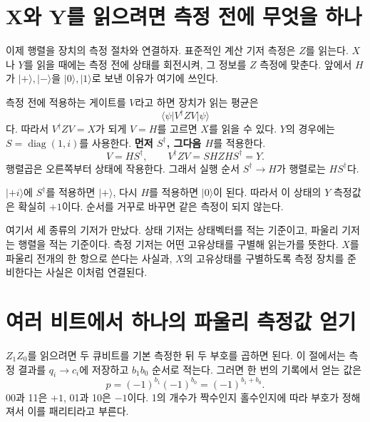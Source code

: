 \section{X와 Y를 읽으려면 측정 전에 무엇을 하나}

이제 행렬을 장치의 측정 절차와 연결하자.
표준적인 계산 기저 측정은 \(Z\)를 읽는다.
\(X\)나 \(Y\)를 읽을 때에는 측정 전에 상태를 회전시켜, 그 정보를 \(Z\) 측정에 맞춘다.
앞에서 \(H\)가 \(\lvert+\rangle,\lvert-\rangle\)을
\(\lvert0\rangle,\lvert1\rangle\)로 보낸 이유가 여기에 쓰인다.

측정 전에 적용하는 게이트를 \(V\)라고 하면 장치가 읽는 평균은
\[
\langle\psi\rvert V^\dagger ZV\lvert\psi\rangle
\]
다. 따라서 \(V^\dagger ZV=X\)가 되게 \(V=H\)를 고르면 \(X\)를 읽을 수 있다.
\(Y\)의 경우에는 \(S=\operatorname{diag}(1,i)\)를 사용한다.
\textbf{먼저 \(S^\dagger\), 그다음 \(H\)}를 적용한다.
\[
V=HS^\dagger,\qquad V^\dagger ZV=SHZHS^\dagger=Y.
\]
행렬곱은 오른쪽부터 상태에 작용한다. 그래서 실행 순서
\(S^\dagger\to H\)가 행렬로는 \(HS^\dagger\)다.


\(\lvert+i\rangle\)에 \(S^\dagger\)를 적용하면 \(\lvert+\rangle\),
다시 \(H\)를 적용하면 \(\lvert0\rangle\)이 된다.
따라서 이 상태의 \(Y\) 측정값은 확실히 \(+1\)이다.
순서를 거꾸로 바꾸면 같은 측정이 되지 않는다.

여기서 세 종류의 기저가 만났다. 상태 기저는 상태벡터를 적는 기준이고,
파울리 기저는 행렬을 적는 기준이다. 측정 기저는 어떤 고유상태를 구별해 읽는가를 뜻한다.
\(X\)를 파울리 전개의 한 항으로 쓴다는 사실과,
\(X\)의 고유상태를 구별하도록 측정 장치를 준비한다는 사실은 이처럼 연결된다.

\section{여러 비트에서 하나의 파울리 측정값 얻기}

\(Z_1Z_0\)를 읽으려면 두 큐비트를 기본 측정한 뒤 두 부호를 곱하면 된다.
이 절에서는 측정 결과를 \(q_i\to c_i\)에 저장하고 \(b_1b_0\) 순서로 적는다.
그러면 한 번의 기록에서 얻는 값은
\[
p=(-1)^{b_1}(-1)^{b_0}=(-1)^{b_1+b_0}.
\]
00과 11은 \(+1\), 01과 10은 \(-1\)이다.
1의 개수가 짝수인지 홀수인지에 따라 부호가 정해져서 이를 패리티라고 부른다.


